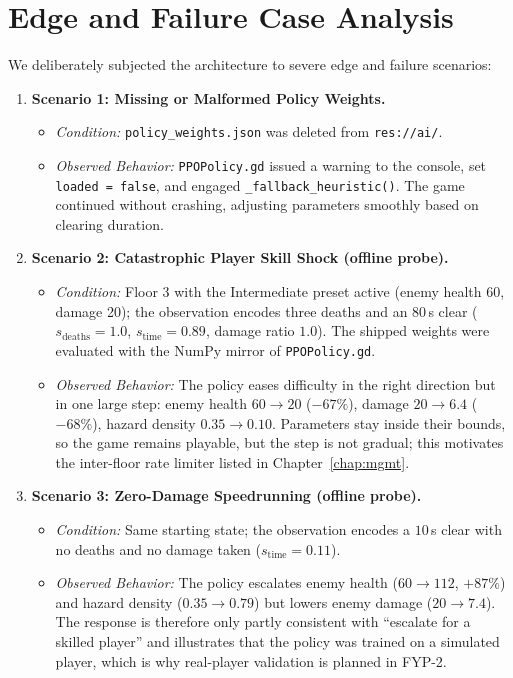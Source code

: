 \section{Edge and Failure Case Analysis}
We deliberately subjected the architecture to severe edge and failure scenarios:
\begin{enumerate}
    \item \textbf{Scenario 1: Missing or Malformed Policy Weights.}
    \begin{itemize}
        \item \textit{Condition:} \texttt{policy\_weights.json} was deleted from \texttt{res://ai/}.
        \item \textit{Observed Behavior:} \texttt{PPOPolicy.gd} issued a warning to the console, set \texttt{loaded = false}, and engaged \texttt{\_fallback\_heuristic()}. The game continued without crashing, adjusting parameters smoothly based on clearing duration.
    \end{itemize}
    \item \textbf{Scenario 2: Catastrophic Player Skill Shock (offline probe).}
    \begin{itemize}
        \item \textit{Condition:} Floor 3 with the Intermediate preset active (enemy health 60, damage 20); the observation encodes three deaths and an $80$\,s clear ($s_{\text{deaths}} = 1.0$, $s_{\text{time}} = 0.89$, damage ratio $1.0$). The shipped weights were evaluated with the NumPy mirror of \texttt{PPOPolicy.gd}.
        \item \textit{Observed Behavior:} The policy eases difficulty in the right direction but in one large step: enemy health $60 \rightarrow 20$ ($-67\%$), damage $20 \rightarrow 6.4$ ($-68\%$), hazard density $0.35 \rightarrow 0.10$. Parameters stay inside their bounds, so the game remains playable, but the step is not gradual; this motivates the inter-floor rate limiter listed in Chapter~\ref{chap:mgmt}.
    \end{itemize}
    \item \textbf{Scenario 3: Zero-Damage Speedrunning (offline probe).}
    \begin{itemize}
        \item \textit{Condition:} Same starting state; the observation encodes a $10$\,s clear with no deaths and no damage taken ($s_{\text{time}} = 0.11$).
        \item \textit{Observed Behavior:} The policy escalates enemy health ($60 \rightarrow 112$, $+87\%$) and hazard density ($0.35 \rightarrow 0.79$) but lowers enemy damage ($20 \rightarrow 7.4$). The response is therefore only partly consistent with ``escalate for a skilled player'' and illustrates that the policy was trained on a simulated player, which is why real-player validation is planned in FYP-2.
    \end{itemize}
\end{enumerate}

